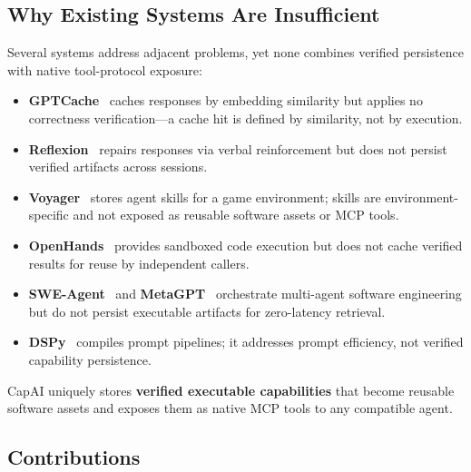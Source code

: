 \documentclass[conference]{IEEEtran}
\begin{document}
\subsection{Why Existing Systems Are Insufficient}
\label{subsec:why_existing}

Several systems address adjacent problems, yet none combines verified
persistence with native tool-protocol exposure:

\begin{itemize}
  \item \textbf{GPTCache}~\cite{gptcache2023} caches responses by
        embedding similarity but applies no correctness verification---a
        cache hit is defined by similarity, not by execution.
  \item \textbf{Reflexion}~\cite{shinn2023reflexion} repairs responses via
        verbal reinforcement but does not persist verified artifacts
        across sessions.
  \item \textbf{Voyager}~\cite{wang2023voyager} stores agent skills for a
        game environment; skills are environment-specific and not exposed
        as reusable software assets or MCP tools.
  \item \textbf{OpenHands}~\cite{wang2024openhands} provides sandboxed
        code execution but does not cache verified results for reuse by
        independent callers.
  \item \textbf{SWE-Agent}~\cite{yang2024sweagent} and
        \textbf{MetaGPT}~\cite{hong2023metagpt} orchestrate multi-agent
        software engineering but do not persist executable artifacts for
        zero-latency retrieval.
  \item \textbf{DSPy}~\cite{khattab2023dspy} compiles prompt pipelines;
        it addresses prompt efficiency, not verified capability persistence.
\end{itemize}

CapAI uniquely stores \textbf{verified executable capabilities} that
become reusable software assets and exposes them as native MCP tools to
any compatible agent.

\subsection{Contributions}
\end{document}
